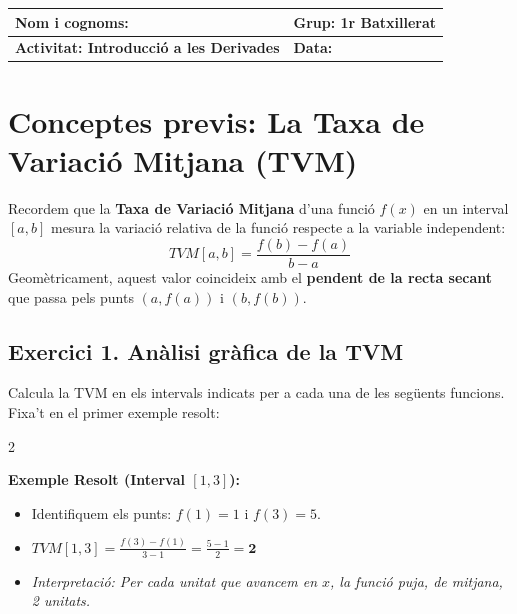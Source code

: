 \documentclass[12pt,a4paper]{article}
\begin{document}
\begingroup
\renewcommand{\arraystretch}{2.2}
\begin{tabularx}{\textwidth}{|X|p{4cm}|}
    \hline
    \textbf{Nom i cognoms:} & \textbf{Grup: 1r Batxillerat} \\ \hline
    \textbf{Activitat: Introducció a les Derivades}  & \textbf{Data:} \\ \hline
\end{tabularx}
\endgroup

\vspace{0.8cm}

\section*{Conceptes previs: La Taxa de Variació Mitjana (TVM)}

Recordem que la \textbf{Taxa de Variació Mitjana} d'una funció $f(x)$ en un interval $[a, b]$ mesura la variació relativa de la funció respecte a la variable independent:
$$TVM[a, b] = \frac{f(b) - f(a)}{b - a}$$
Geomètricament, aquest valor coincideix amb el \textbf{pendent de la recta secant} que passa pels punts $(a, f(a))$ i $(b, f(b))$.

\subsection*{Exercici 1. Anàlisi gràfica de la TVM}

Calcula la TVM en els intervals indicats per a cada una de les següents funcions. Fixa't en el primer exemple resolt:

\begin{multicols}{2}

\begin{center}
\end{center}
\columnbreak
\textbf{Exemple Resolt (Interval $[1, 3]$):}
\begin{itemize}
    \item Identifiquem els punts: $f(1)=1$ i $f(3)=5$.
    \item $TVM[1, 3] = \frac{f(3)-f(1)}{3-1} = \frac{5-1}{2} = \mathbf{2}$
    \item \textit{Interpretació: Per cada unitat que avancem en $x$, la funció puja, de mitjana, 2 unitats.}
\end{itemize}

\end{multicols}
\end{document}
